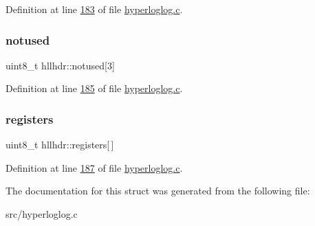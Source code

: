 Definition at line \hyperlink{hyperloglog_8c_source_l00183}{183} of file \hyperlink{hyperloglog_8c_source}{hyperloglog.\+c}.

\mbox{\label{structhllhdr_a9354341df226d8c3a7f7e6cee89fd1dc}} 
\subsubsection{\texorpdfstring{notused}{notused}}
{\footnotesize\ttfamily uint8\+\_\+t hllhdr\+::notused\mbox{[}3\mbox{]}}



Definition at line \hyperlink{hyperloglog_8c_source_l00185}{185} of file \hyperlink{hyperloglog_8c_source}{hyperloglog.\+c}.

\mbox{\label{structhllhdr_a29e29f4222106a56dd578e68a1d079f3}} 
\subsubsection{\texorpdfstring{registers}{registers}}
{\footnotesize\ttfamily uint8\+\_\+t hllhdr\+::registers\mbox{[}$\,$\mbox{]}}



Definition at line \hyperlink{hyperloglog_8c_source_l00187}{187} of file \hyperlink{hyperloglog_8c_source}{hyperloglog.\+c}.



The documentation for this struct was generated from the following file\+:\begin{DoxyCompactItemize}
\item 
src/hyperloglog.\+c\end{DoxyCompactItemize}

